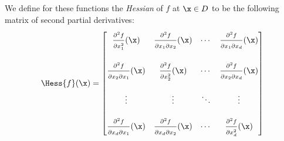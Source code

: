 We define for these functions the \emph{Hessian} of $f$ at $\x \in D$ to be the following matrix of second partial derivatives:
\begin{equation*}
\Hess{f}(\x) = \begin{bmatrix}
\frac{\strut\partial^2 f}{\strut\partial x_1^2}(\x) & \frac{\strut\partial^2 f}{\strut\partial x_1 \partial x_2}(\x) &\dotsb &\frac{\strut\partial^2 f}{\strut\partial x_1 \partial x_d}(\x) \\
&&&\\
\frac{\strut\partial^2 f}{\strut\partial x_2 \partial x_1}(\x) & \frac{\strut\partial^2 f}{\strut\partial x_2^2}(\x) &\dotsb &\frac{\strut\partial^2 f}{\strut\partial x_2 \partial x_d}(\x) \\
&&& \\
\vdots & \vdots &\ddots &\vdots \\
&&& \\
\frac{\strut\partial^2 f}{\strut\partial x_d \partial x_1}(\x) & \frac{\strut\partial^2 f}{\strut\partial x_d \partial x_2}(\x) &\dotsb &\frac{\strut\partial^2 f}{\strut\partial x_d^2}(\x)
\end{bmatrix}
\end{equation*}